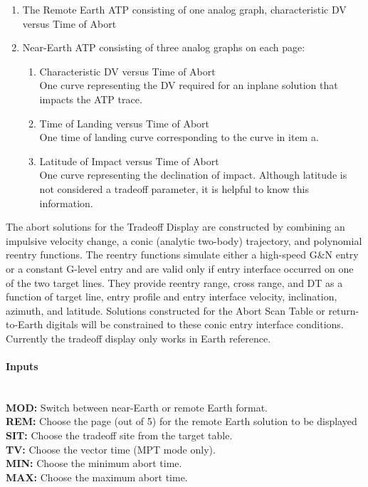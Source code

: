 \documentclass[11pt]{article} %
\begin{document}
\begin{enumerate}
	\item The Remote Earth ATP consisting of one analog graph, characteristic DV versus Time of Abort
	\item Near-Earth ATP consisting of three analog graphs on each page:
	\begin{enumerate}
		\item Characteristic DV versus Time of Abort\\
					One curve representing the DV required for an inplane solution that impacts the ATP trace.
		\item Time of Landing versus Time of Abort\\
					One time of landing curve corresponding to the curve in item a.
		\item Latitude of Impact versus Time of Abort\\
					One curve representing the declination of impact. Although latitude is not considered a tradeoff parameter, it is helpful to know this information.
\end{enumerate}
\end{enumerate}

The abort solutions for the Tradeoff Display are constructed by combining an impulsive velocity change, a conic (analytic two-body) trajectory, and polynomial reentry
functions. The reentry functions simulate either a high-speed G\&N entry or a constant G-level entry and are valid only if entry interface occurred on one of the
two target lines. They provide reentry range, cross range, and DT as a function of target line, entry profile and entry interface velocity, inclination, azimuth,
and latitude. Solutions constructed for the Abort Scan Table or return-to-Earth digitals will be constrained to these conic entry interface conditions.\\

Currently the tradeoff display only works in Earth reference.

\paragraph{Inputs}\mbox{} \\

\textbf{MOD:} Switch between near-Earth or remote Earth format.\\
\textbf{REM:} Choose the page (out of 5) for the remote Earth solution to be displayed\\
\textbf{SIT:} Choose the tradeoff site from the target table.\\
\textbf{TV:} Choose the vector time (MPT mode only).\\
\textbf{MIN:} Choose the minimum abort time.\\
\textbf{MAX:} Choose the maximum abort time.\\
\end{document}
